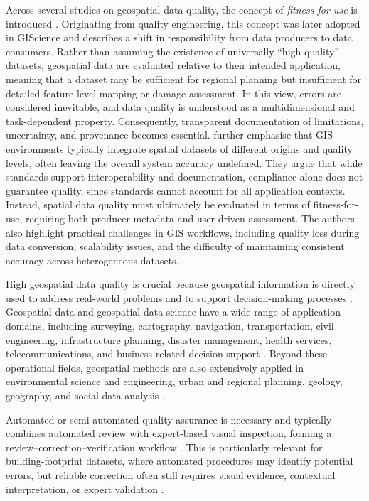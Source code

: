 Across several studies on geospatial data quality, the concept of \emph{fitness-for-use} is introduced \citep{dataqualityinEarthobservation, veregin1999data, Chrisman_Theerrorcomponent, Vieira_dataqualityindicators}. Originating from quality engineering, this concept was later adopted in GIScience and describes a shift in responsibility from data producers to data consumers. Rather than assuming the existence of universally “high-quality” datasets, geospatial data are evaluated relative to their intended application, meaning that a dataset may be sufficient for regional planning but insufficient for detailed feature-level mapping or damage assessment. In this view, errors are considered inevitable, and data quality is understood as a multidimensional and task-dependent property. Consequently, transparent documentation of limitations, uncertainty, and provenance becomes essential. \citet{caprioli2003rules} further emphasise that GIS environments typically integrate spatial datasets of different origins and quality levels, often leaving the overall system accuracy undefined. They argue that while standards support interoperability and documentation, compliance alone does not guarantee quality, since standards cannot account for all application contexts. Instead, spatial data quality must ultimately be evaluated in terms of fitness-for-use, requiring both producer metadata and user-driven assessment. The authors also highlight practical challenges in GIS workflows, including quality loss during data conversion, scalability issues, and the difficulty of maintaining consistent accuracy across heterogeneous datasets.

High geospatial data quality is crucial because geospatial information is directly used to address real-world problems and to support decision-making processes \citep{GeospatialData_Selmy}. Geospatial data and geospatial data science have a wide range of application domains, including surveying, cartography, navigation, transportation, civil engineering, infrastructure planning, disaster management, health services, telecommunications, and business-related decision support \citep{karimi2017geospatial, GeospatialData_Selmy}. Beyond these operational fields, geospatial methods are also extensively applied in environmental science and engineering, urban and regional planning, geology, geography, and social data analysis \citep{karimi2017geospatial}.

Automated or semi-automated quality assurance is necessary and typically combines automated review with expert-based visual inspection, forming a review–correction–verification workflow \citep{GeospatialData_Selmy}. This is particularly relevant for building-footprint datasets, where automated procedures may identify potential errors, but reliable correction often still requires visual evidence, contextual interpretation, or expert validation \citep{GeospatialData_Selmy}.

